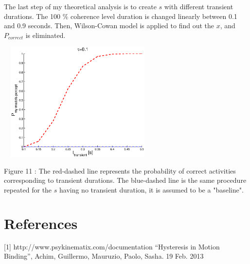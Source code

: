 \documentclass[twocolumn]{article}
\begin{document}
The last step of my theoretical analysis is to create $s$ with different transient durations. The 100 \% coherence level duration is changed linearly between 0.1 and 0.9 seconds. Then, Wilson-Cowan model is applied to find out the $x$, and $P_{correct}$ is eliminated.

 \begin{center}
\includegraphics[width=80mm,height=60mm]{my_P_correct.eps} 
   \begin{footnotesize} Figure 11 : The red-dashed line represents the probability of correct activities corresponding to transient durations. The blue-dashed line is the same procedure repeated for the $s$ having no transient duration, it is assumed to be a "baseline".  \end{footnotesize}
\end{center}

\section{References}

[1] http://www.psykinematix.com/documentation
\newline
\newline
[2]``Hysteresis in Motion Binding'', Achim, Guillermo, Mauruzio, Paolo, Sasha. 19 Feb. 2013
\end{document}

